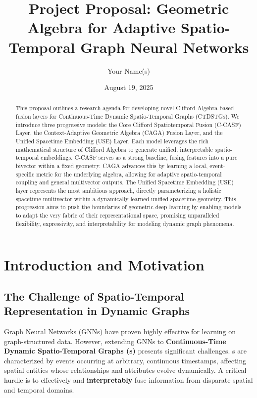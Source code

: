 \documentclass[11pt]{article}
\newcommand{\STG}{\text{CTDSTG}} %
\begin{document}
\title{\textbf{Project Proposal: Geometric Algebra for Adaptive Spatio-Temporal Graph Neural Networks}}
\author{Your Name(s)}
\date{August 19, 2025}

\maketitle

\begin{abstract}
This proposal outlines a research agenda for developing novel Clifford Algebra-based fusion layers for Continuous-Time Dynamic Spatio-Temporal Graphs (CTDSTGs). We introduce three progressive models: the Core Clifford Spatiotemporal Fusion (C-CASF) Layer, the Context-Adaptive Geometric Algebra (CAGA) Fusion Layer, and the Unified Spacetime Embedding (USE) Layer. Each model leverages the rich mathematical structure of Clifford Algebra to generate unified, interpretable spatio-temporal embeddings. C-CASF serves as a strong baseline, fusing features into a pure bivector within a fixed geometry. CAGA advances this by learning a local, event-specific metric for the underlying algebra, allowing for adaptive spatio-temporal coupling and general multivector outputs. The Unified Spacetime Embedding (USE) layer represents the most ambitious approach, directly parameterizing a holistic spacetime multivector within a dynamically learned unified spacetime geometry. This progression aims to push the boundaries of geometric deep learning by enabling models to adapt the very fabric of their representational space, promising unparalleled flexibility, expressivity, and interpretability for modeling dynamic graph phenomena.
\end{abstract}

\section{Introduction and Motivation}

\subsection{The Challenge of Spatio-Temporal Representation in Dynamic Graphs}
Graph Neural Networks (GNNs) have proven highly effective for learning on graph-structured data. However, extending GNNs to \textbf{Continuous-Time Dynamic Spatio-Temporal Graphs (\STG s)} presents significant challenges. \STG s are characterized by events occurring at arbitrary, continuous timestamps, affecting spatial entities whose relationships and attributes evolve dynamically. A critical hurdle is to effectively and \textbf{interpretably} fuse information from disparate spatial and temporal domains.
\end{document}
